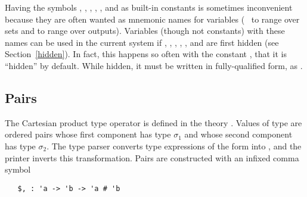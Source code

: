 Having the symbols , , , , , and 
as built-in constants
is sometimes inconvenient because they are often wanted
as mnemonic names for variables (\eg\  to range over sets and
 to range over outputs).  Variables (though not constants) with
these names can be used in the current system if , , ,
, , and  are first hidden (see
Section~\ref{hidden}).  In fact, this happens so often with the
constant , that it is ``hidden'' by default.  While hidden,
it must be written in fully-qualified form, as .
%


\subsection{Pairs}\label{prod}

%
The Cartesian  product  type  operator
%
%
%
%
is defined in the theory . Values of type
 are ordered pairs whose first
component has type $\sigma_1$ and whose second component has type
$\sigma_2$.  The \HOL{} type parser
%
%
converts type expressions of the form 
%
%
into ,
%
%
and the printer inverts this transformation. Pairs
%
%
are constructed with an infixed comma symbol

\begin{hol}
\begin{verbatim}
   $, : 'a -> 'b -> 'a # 'b
\end{verbatim}
\end{hol}

